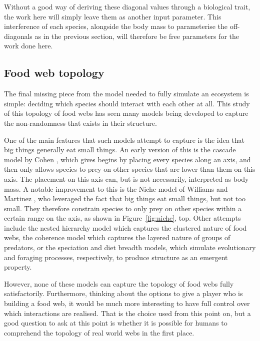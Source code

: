 Without a good way of deriving these diagonal values through a biological trait, the work here will simply leave them as another input parameter. This interference of each species, alongside the body mass to parameterise the off-diagonals as in the previous section, will therefore be free parameters for the work done here. 


\subsection{Food web topology}
\label{sec:topology}
The final missing piece from the model needed to fully simulate an ecosystem is simple: deciding which species should interact with each other at all.
This study of this topology of food webs has seen many models being developed to capture the non-randomness that exists in their structure.

One of the main features that such models attempt to capture is the idea that big things generally eat small things. An early version of this is the cascade model by Cohen \cite{Cohen2012}, which gives begins by placing every species along an axis, and then only allows species to prey on other species that are lower than them on this axis. The placement on this axis can, but is not necessarily, interpreted as body mass.
A notable improvement to this is the Niche model of Williams and Martinez \cite{Williams2000}, who leveraged the fact that big things eat small things, but not too small. They therefore constrain species to only prey on other species within a certain range on the axis, as shown in Figure~\ref{fig:niche}, top.
Other attempts include the nested hierarchy model \cite{Cattin2004} which captures the clustered nature of food webs, the coherence model \cite{Johnson2014} which captures the layered nature of groups of predators, or the speciation \cite{Rossberg2006} and diet breadth \cite{Petchey2008} models, which simulate evolutionary and foraging processes, respectively, to produce structure as an emergent property. 

However, none of these models can capture the topology of food webs fully satisfactorily. Furthermore, thinking about the options to give a player who is building a food web, it would be much more interesting to have full control over which interactions are realised. That is the choice used from this point on, but a good question to ask at this point is whether it is possible for humans to comprehend the topology of real world webs in the first place.

